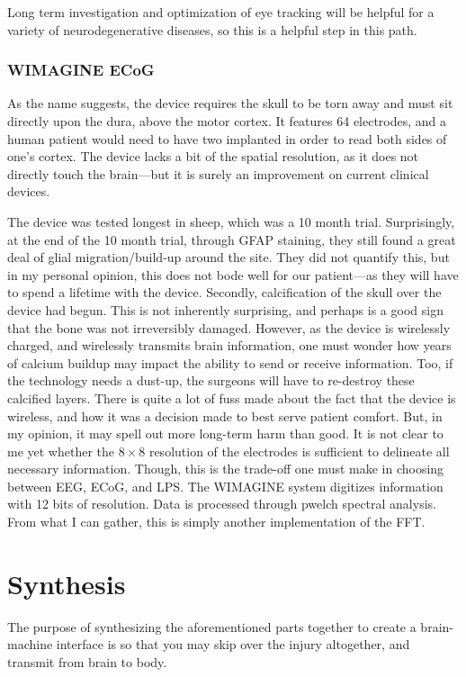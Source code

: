 \documentclass[12pt]{report}
\begin{document}
Long term investigation and optimization of eye tracking will be helpful for a variety of neurodegenerative diseases, so this is a helpful step in this path. 


\subsection{WIMAGINE ECoG}
As the name suggests, the device requires the skull to be torn away and must sit directly upon the dura, above the motor cortex. It features 64 electrodes, and a human patient would need to have two implanted in order to read both sides of one's cortex. The device lacks a bit of the spatial resolution, as it does not directly touch the brain---but it is surely an improvement on current clinical devices.\newline

The device was tested longest in sheep, which was a 10 month trial. Surprisingly, at the end of the 10 month trial, through GFAP staining, they still found a great deal of glial migration/build-up around the site. They did not quantify this, but in my personal opinion, this does not bode well for our patient---as they will have to spend a lifetime with the device. Secondly, calcification of the skull over the device had begun. This is not inherently surprising, and perhaps is a good sign that the bone was not irreversibly damaged. However, as the device is wirelessly charged, and wirelessly transmits brain information, one must wonder how years of calcium buildup may impact the ability to send or receive information. Too, if the technology needs a dust-up, the surgeons will have to re-destroy these calcified layers. There is quite a lot of fuss made about the fact that the device is wireless, and how it was a decision made to best serve patient comfort. But, in my opinion, it may spell out more long-term harm than good. It is not clear to me yet whether the $8\times 8$ resolution of the electrodes is sufficient to delineate all necessary information. Though, this is the trade-off one must make in choosing between EEG, ECoG, and LPS. The WIMAGINE system digitizes information with 12 bits of resolution. Data is processed through pwelch spectral analysis. From what I can gather, this is simply another implementation of the FFT. 


\chapter{Synthesis}

The purpose of synthesizing the aforementioned parts together to create a brain-machine interface is so that you may skip over the injury altogether, and transmit from brain to body. 
\end{document}
